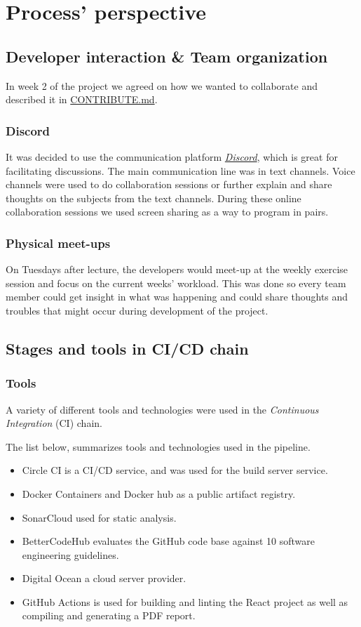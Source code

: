 \section{Process' perspective}
\subsection{Developer interaction \& Team organization}
 In week 2 of the project we agreed on how we wanted to collaborate and described it in \href{https://raw.githubusercontent.com/Chillhound/DevOps2022F/main/CONTRIBUTE.md}{CONTRIBUTE.md}.

\subsubsection{Discord}
It was decided to use the communication platform \href{https://discord.com/}{\textit{Discord}}, which is great for facilitating discussions. The main communication line was in text channels. Voice channels were used to do collaboration sessions or further explain and share thoughts on the subjects from the text channels. During these online collaboration sessions we used screen sharing as a way to program in pairs.\\

\subsubsection{Physical meet-ups}
On Tuesdays after lecture, the developers would meet-up at the weekly exercise session and focus on the current weeks' workload. This was done so every team member could get insight in what was happening and could share thoughts and troubles that might occur during development of the project.

\subsection{Stages and tools in CI/CD chain}
\subsubsection{Tools}
A variety of different tools and technologies were used in the \textit{Continuous Integration} (CI) chain. 

The list below, summarizes tools and technologies used in the pipeline. 
\begin{itemize}
    \item Circle CI is a CI/CD service, and was used for the build server service.
    \item Docker Containers and Docker hub as a public artifact registry.
    \item SonarCloud used for static analysis.
    \item BetterCodeHub evaluates the GitHub code base against 10 software engineering guidelines.
    \item Digital Ocean a cloud server provider.
    \item GitHub Actions is used for building and linting the React project as well as compiling and generating a PDF report.
\end{itemize}

